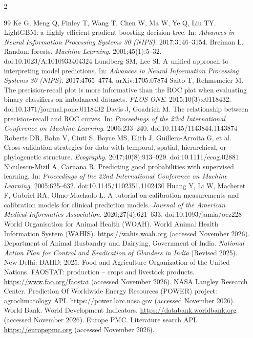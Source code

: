 \documentclass[11pt]{article}
\begin{document}
\begin{multicols}{2}
\begin{thebibliography}{99}
 Ke G, Meng Q, Finley T, Wang T, Chen W, Ma W, Ye Q, Liu TY. LightGBM: a highly efficient gradient boosting decision tree. In: \emph{Advances in Neural Information Processing Systems 30 (NIPS)}. 2017:3146--3154.
 Breiman L. Random forests. \emph{Machine Learning}. 2001;45(1):5--32. doi:10.1023/A:1010933404324
 Lundberg SM, Lee SI. A unified approach to interpreting model predictions. In: \emph{Advances in Neural Information Processing Systems 30 (NIPS)}. 2017:4765--4774. arXiv:1705.07874
 Saito T, Rehmsmeier M. The precision-recall plot is more informative than the ROC plot when evaluating binary classifiers on imbalanced datasets. \emph{PLOS ONE}. 2015;10(3):e0118432. doi:10.1371/journal.pone.0118432
 Davis J, Goadrich M. The relationship between precision-recall and ROC curves. In: \emph{Proceedings of the 23rd International Conference on Machine Learning}. 2006:233--240. doi:10.1145/1143844.1143874
 Roberts DR, Bahn V, Ciuti S, Boyce MS, Elith J, Guillera-Arroita G, et al. Cross-validation strategies for data with temporal, spatial, hierarchical, or phylogenetic structure. \emph{Ecography}. 2017;40(8):913--929. doi:10.1111/ecog.02881
 Niculescu-Mizil A, Caruana R. Predicting good probabilities with supervised learning. In: \emph{Proceedings of the 22nd International Conference on Machine Learning}. 2005:625--632. doi:10.1145/1102351.1102430
 Huang Y, Li W, Macheret F, Gabriel RA, Ohno-Machado L. A tutorial on calibration measurements and calibration models for clinical prediction models. \emph{Journal of the American Medical Informatics Association}. 2020;27(4):621--633. doi:10.1093/jamia/ocz228
 World Organisation for Animal Health (WOAH). World Animal Health Information System (WAHIS). \url{https://wahis.woah.org} (accessed November 2026).
 Department of Animal Husbandry and Dairying, Government of India. \emph{National Action Plan for Control and Eradication of Glanders in India} (Revised 2025). New Delhi: DAHD; 2025.
 Food and Agriculture Organization of the United Nations. FAOSTAT: production -- crops and livestock products. \url{https://www.fao.org/faostat} (accessed November 2026).
 NASA Langley Research Center. Prediction Of Worldwide Energy Resources (POWER) project: agroclimatology API. \url{https://power.larc.nasa.gov} (accessed November 2026).
 World Bank. World Development Indicators. \url{https://databank.worldbank.org} (accessed November 2026).
 Europe PMC. Literature search API. \url{https://europepmc.org} (accessed November 2026).
\end{thebibliography}
\end{multicols}
\end{document}
